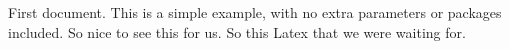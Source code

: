 \documentclass{article}
\begin{document}
First document. This is a simple example, with no 
extra parameters or packages included. So nice to see this for us. So this Latex that we were waiting for.
\end{document}
